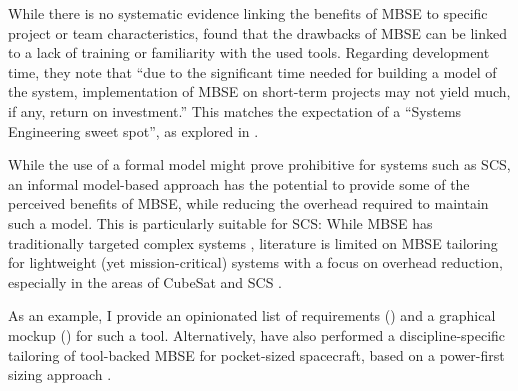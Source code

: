 \documentclass[a4paper,nobib,justified,final]{tufte-book}
\begin{document}
While there is no systematic evidence linking the benefits of \acs{MBSE} to specific project or team characteristics, \citeauthor{campoModelbasedSystemsEngineering2023} found that the drawbacks of \acs{MBSE} can be linked to a lack of training or familiarity with the used tools. Regarding development time, they note that ``due to the significant time needed for building  a model of the system, implementation of MBSE on short-term projects  may not yield much, if any, return on investment.'' \cite{campoModelbasedSystemsEngineering2023}
This matches the expectation of a ``Systems Engineering sweet spot'', as explored in .

%
\label{sec:METHODOLOGY_edm_novelty}
While the use of a formal model might prove prohibitive for systems such as \acl{SCS}, an informal model-based approach has the potential to provide some of the perceived benefits of \acs{MBSE}, while reducing the overhead required to maintain such a model. This is particularly suitable for \acs{SCS}: While \acs{MBSE} has traditionally targeted complex systems \autocite{hendersonMBSEAdoptionExperiences2024,estefanSurveyModelBasedSystems2008}, literature is limited on \acs{MBSE} tailoring for lightweight (yet mission-critical) systems with a focus on overhead reduction, especially in the areas of CubeSat and \acl{SCS} \autocite{honore-livermoreIntegratingAgileSystems2022,minacapilliSmallSatellitesMission2022,uludagTailoringModelBasedSystems}.

As an example, I provide an opinionated list of requirements () and a graphical mockup () for such a tool. Alternatively, \citeauthor{uludagTailoringModelBasedSystems} have also performed a discipline-specific tailoring of tool-backed \acs{MBSE} for pocket-sized spacecraft, based on a power-first sizing approach \autocite{uludagTailoringModelBasedSystems}.
\end{document}
